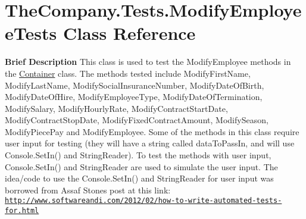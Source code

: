 \hypertarget{class_the_company_1_1_tests_1_1_modify_employee_tests}{}\section{The\+Company.\+Tests.\+Modify\+Employee\+Tests Class Reference}
\label{class_the_company_1_1_tests_1_1_modify_employee_tests}


{\bfseries  Brief Description} This class is used to test the Modify\+Employee methods in the \hyperlink{class_the_company_1_1_container}{Container} class. The methods tested include Modify\+First\+Name, Modify\+Last\+Name, Modify\+Social\+Insurance\+Number, Modify\+Date\+Of\+Birth, Modify\+Date\+Of\+Hire, Modify\+Employee\+Type, Modify\+Date\+Of\+Termination, Modify\+Salary, Modify\+Hourly\+Rate, Modify\+Contract\+Start\+Date, Modify\+Contract\+Stop\+Date, Modify\+Fixed\+Contract\+Amount, Modify\+Season, Modify\+Piece\+Pay and Modify\+Employee. Some of the methods in this class require user input for testing (they will have a string called data\+To\+Pass\+In, and will use Console.\+Set\+In() and String\+Reader). To test the methods with user input, Console.\+Set\+In() and String\+Reader are used to simulate the user input. The idea/code to use the Console.\+Set\+In() and String\+Reader for user input was borrowed from Assaf Stone\textquotesingle{}s post at this link\+: \href{http://www.softwareandi.com/2012/02/how-to-write-automated-tests-for.html}{\tt http\+://www.\+softwareandi.\+com/2012/02/how-\/to-\/write-\/automated-\/tests-\/for.\+html}  


